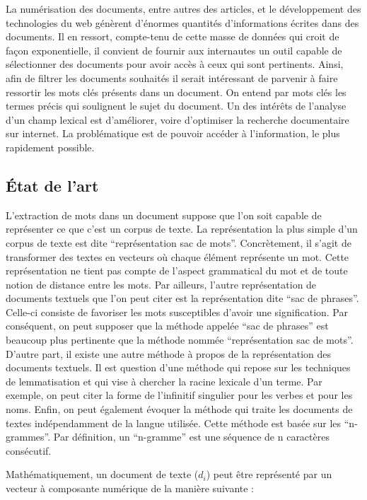 \documentclass[a4paper,10pt]{article}
\begin{document}
La numérisation des documents, entre autres des articles,
et le développement des technologies du web génèrent d’énormes
quantités d’informations écrites dans des documents.
Il en ressort, compte-tenu de cette masse de données qui croit de
façon exponentielle, il convient de fournir aux internautes un
outil capable de sélectionner des documents pour avoir accès à
ceux qui sont pertinents.
Ainsi, afin de filtrer les documents souhaités il serait intéressant
de parvenir à faire ressortir les mots clés présents dans un document.
On entend par mots clés les termes précis qui soulignent le sujet
du document. Un des intérêts de l’analyse d’un champ lexical est
d’améliorer, voire d’optimiser la recherche documentaire sur internet.
La problématique est de pouvoir accéder à l’information,
le plus rapidement possible.

\subsection*{\'Etat de l’art}

L’extraction de mots dans un document suppose que l’on soit capable
de représenter ce que c’est un corpus de texte.
La représentation la plus simple d’un corpus de texte est dite
``représentation sac de mots''.
Concrètement, il s’agit de transformer des textes en vecteurs où
chaque élément représente un mot.
Cette représentation ne tient pas compte de l’aspect grammatical du
mot et de toute notion de distance entre les mots.
Par ailleurs, l’autre représentation de documents textuels que
l’on peut citer est la représentation dite ``sac de phrases''.
Celle-ci consiste de favoriser les mots susceptibles d’avoir
une signification. Par conséquent, on peut supposer que la méthode
appelée ``sac de phrases'' est beaucoup plus pertinente que
la méthode nommée ``représentation sac de mots''.
D’autre part, il existe une autre méthode à propos de la
représentation des documents textuels.
Il est question d’une méthode qui repose sur les techniques de
lemmatisation et qui vise à chercher la racine lexicale d’un terme.
Par exemple, on peut citer la forme de l’infinitif singulier
pour les verbes et pour les noms.
Enfin, on peut également évoquer la méthode qui traite les documents
de textes indépendamment de la langue utilisée.
Cette méthode est basée sur les ``n-grammes''.
Par définition, un ``n-gramme'' est une séquence de n caractères
consécutif.

Mathématiquement, un document de texte ($d_i$) peut être
représenté par un vecteur à composante numérique de
la manière suivante :
\end{document}
